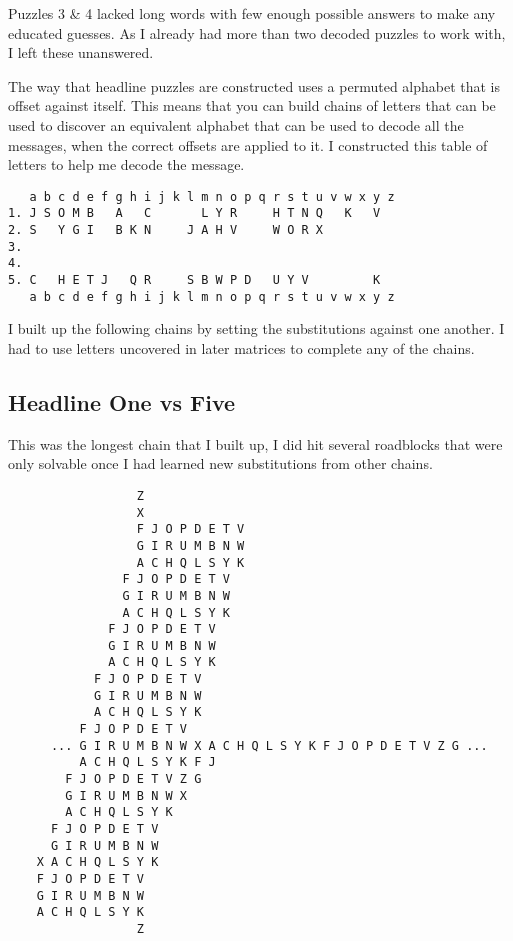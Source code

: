 \documentclass[11pt,a4paper,twoside]{article}
\begin{document}
Puzzles 3 \& 4 lacked long words with few enough possible answers to make any
educated guesses. As I already had more than two decoded puzzles to work with,
I left these unanswered.  

The way that headline puzzles are constructed uses a permuted alphabet that is
offset against itself. This means that you can build chains of letters that can
be used to discover an equivalent alphabet that can be used to decode all the
messages, when the correct offsets are applied to it. I constructed this table
of letters to help me decode the message. 

\begin{lstlisting}
   a b c d e f g h i j k l m n o p q r s t u v w x y z
1. J S O M B   A   C       L Y R     H T N Q   K   V   
2. S   Y G I   B K N     J A H V     W O R X           
3.                                                     
4.                                                     
5. C   H E T J   Q R     S B W P D   U Y V         K   
   a b c d e f g h i j k l m n o p q r s t u v w x y z
\end{lstlisting}

I built up the following chains by setting the substitutions against one
another. I had to use letters uncovered in later matrices to complete any of
the chains. 

\pagebreak
\subsection{Headline One vs Five}
This was the longest chain that I built up, I did hit several roadblocks that
were only solvable once I had learned new substitutions from other chains. 

\begin{lstlisting}
                  Z
                  X
                  F J O P D E T V 
                  G I R U M B N W  
                  A C H Q L S Y K 
                F J O P D E T V 
                G I R U M B N W  
                A C H Q L S Y K 
              F J O P D E T V 
              G I R U M B N W
              A C H Q L S Y K
            F J O P D E T V 
            G I R U M B N W 
            A C H Q L S Y K 
          F J O P D E T V  
      ... G I R U M B N W X A C H Q L S Y K F J O P D E T V Z G ...
          A C H Q L S Y K F J
        F J O P D E T V Z G    
        G I R U M B N W X 
        A C H Q L S Y K
      F J O P D E T V 
      G I R U M B N W  
    X A C H Q L S Y K
    F J O P D E T V 
    G I R U M B N W  
    A C H Q L S Y K
                  Z
\end{lstlisting}
\end{document}
